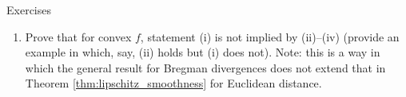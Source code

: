 \begin{xcb}{Exercises}
\begin{enumerate}[label=\thechapter.\arabic*]
\begin{enumerate}[label=\alph*.]
\item Prove that for convex $f$, statement (i) is not implied by (ii)--(iv)
  (provide an example in which, say, (ii) holds but (i) does not). Note: this is
  a way in which the general result for Bregman divergences does not extend that
  in Theorem \ref{thm:lipschitz_smoothness} for Euclidean distance. 
\end{enumerate}
\end{enumerate}
\end{xcb}